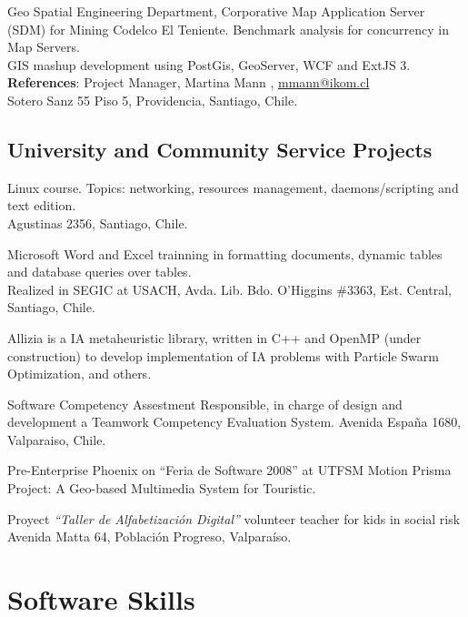 \documentclass[11pt,letterpaper,roman]{moderncv}
\begin{document}
	 {\intership} {\ikom} {\stgo} {}
	{Geo Spatial Engineering Department, Corporative Map Application Server
	(SDM) for  Mining Codelco El Teniente.  Benchmark analysis for concurrency in
	Map Servers. \\
	GIS mashup development using PostGis, GeoServer, WCF and ExtJS 3. 
	\\ \textbf{References}: Project Manager, Martina Mann , \url{mmann@ikom.cl}
	\\ Sotero Sanz
	55 Piso 5, Providencia, Santiago, Chile.}

\subsection{University and Community Service Projects}

	 {\tchr} {\ipgamma} {\stgo} {}
	{\sence Linux course. Topics: networking, resources management,
	daemons/scripting and text edition.\\ Agustinas 2356, Santiago, Chile.}

	 {\tchr} {\otecnewline} {\stgo} {}
	{\sence Microsoft Word and Excel trainning in formatting documents,
	dynamic tables and database queries over tables. \\
	Realized in SEGIC at USACH, Avda. Lib. Bdo. O'Higgins \#3363, Est.
	Central, Santiago, Chile.}

	
	{Allizia is a IA metaheuristic library, written in C++ and OpenMP (under
	construction) to develop implementation of IA problems with Particle Swarm Optimization, and others.}

	 { } {} {}
	{Software Competency Assestment Responsible, in charge of design
	and development a Teamwork Competency Evaluation System. Avenida Espa\~na 1680,
	Valparaiso, Chile.}

	 {\sd} { } {} {}
	{Pre-Enterprise Phoenix on ``Feria de Software 2008'' at \textsc{UTFSM}
	Motion Prisma Project: A Geo-based Multimedia System for Touristic.}

	 {\tchr} {\ernestoquiroz } {\valpo} {}
	{Proyect \textit{``Taller de Alfabetizaci\'on Digital''} volunteer
	teacher for kids in social risk Avenida Matta 64, Poblaci\'on Progreso,
	Valpara\'iso.}
	
\section{Software Skills}
\end{document}
